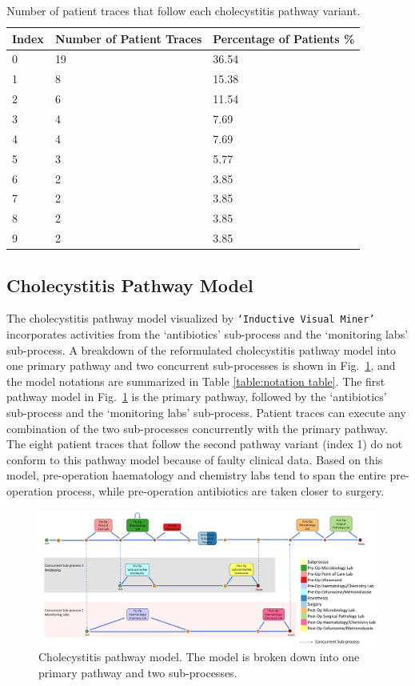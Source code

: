 \begin{table}[t]
\centering
\caption{Number of patient traces that follow each cholecystitis pathway variant.}
\label{table:cholecystitis variant table}
\begin{tabular}{ l l l }
 \hline
 Index & Number of Patient Traces & Percentage of Patients \% \\ 
 \hline
 0 & 19 & 36.54\\ 
 \hline
 1 & 8 & 15.38\\ 
 \hline
 2 & 6 & 11.54\\ 
 \hline
 3 & 4 & 7.69\\ 
 \hline
 4 & 4 & 7.69\\ 
 \hline
 5 & 3 & 5.77\\ 
 \hline
 6 & 2 & 3.85\\ 
 \hline
 7 & 2 & 3.85\\ 
 \hline
 8 & 2 & 3.85\\ 
 \hline
 9 & 2 & 3.85\\ 
 \hline
\end{tabular}
\end{table}

\subsection{Cholecystitis Pathway Model}
The cholecystitis pathway model visualized by \texttt{`Inductive Visual Miner'} incorporates activities from the `antibiotics' sub-process and the `monitoring labs' sub-process. A breakdown of the reformulated cholecystitis pathway model into one primary pathway and two concurrent sub-processes is shown in Fig.~\ref{fig:cholecystitis pathway model}, and the model notations are summarized in Table \ref{table:notation table}. The first pathway model in Fig.~\ref{fig:cholecystitis pathway model} is the primary pathway, followed by the `antibiotics’ sub-process and the `monitoring labs’ sub-process. Patient traces can execute any combination of the two sub-processes concurrently with the primary pathway. The eight patient traces that follow the second pathway variant (index 1) do not conform to this pathway model because of faulty clinical data. Based on this model, pre-operation haematology and chemistry labs tend to span the entire pre-operation process, while pre-operation antibiotics are taken closer to surgery.

\begin{figure}[t]
\centering
\includegraphics[width=18cm,angle=270]{images/communicative_cholecystitis_process_models_anes.jpg}
\caption{Cholecystitis pathway model. The model is broken down into one primary pathway and two sub-processes.}
\label{fig:cholecystitis pathway model}
\end{figure}